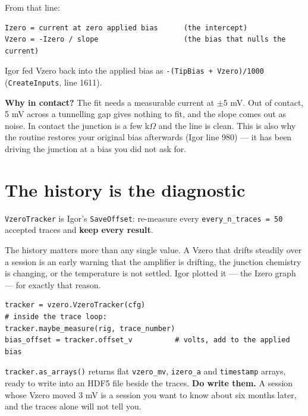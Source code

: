From that line:

\begin{lstlisting}[style=out]
Izero = current at zero applied bias      (the intercept)
Vzero = -Izero / slope                    (the bias that nulls the current)
\end{lstlisting}

Igor fed Vzero back into the applied bias as \texttt{-(Tip\discretionary{}{}{}Bias + Vzero)/\discretionary{}{}{}1000} (\texttt{Create\discretionary{}{}{}Inputs}, line 1611).

\textbf{Why in contact?} The fit needs a measurable current at $\pm$5 mV. Out of contact, 5 mV across a tunnelling gap gives nothing to fit, and the slope comes out as noise. In contact the junction is a few k$\Omega$ and the line is clean. This is also why the routine restores your original bias afterwards (Igor line 980) --- it has been driving the junction at a bias you did not ask for.

\section{The history is the diagnostic}

\texttt{Vzero\discretionary{}{}{}Tracker} is Igor's \texttt{Save\discretionary{}{}{}Offset}: re-measure every \texttt{every\_\discretionary{}{}{}n\_\discretionary{}{}{}traces = 50} accepted traces and \textbf{keep every result}.

The history matters more than any single value. A Vzero that drifts steadily over a session is an early warning that the amplifier is drifting, the junction chemistry is changing, or the temperature is not settled. Igor plotted it --- the Izero graph --- for exactly that reason.

\begin{lstlisting}[style=py]
tracker = vzero.VzeroTracker(cfg)
# inside the trace loop:
tracker.maybe_measure(rig, trace_number)
bias_offset = tracker.offset_v          # volts, add to the applied bias
\end{lstlisting}

\texttt{tracker.\discretionary{}{}{}as\_\discretionary{}{}{}arrays()} returns flat \texttt{vzero\_\discretionary{}{}{}mv}, \texttt{izero\_\discretionary{}{}{}a} and \texttt{timestamp} arrays, ready to write into an HDF5 file beside the traces. \textbf{Do write them.} A session whose Vzero moved 3 mV is a session you want to know about six months later, and the traces alone will not tell you.

